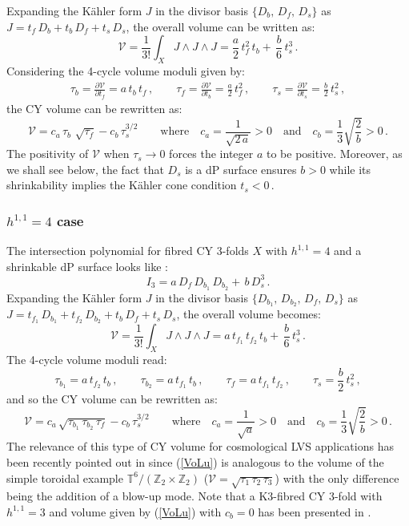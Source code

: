 \documentclass[11pt,a4paper]{article}
\newcommand{\bea}{\begin{eqnarray}}
\newcommand{\eea}{\end{eqnarray}}
\newcommand{\be}{\begin{equation}}
\newcommand{\ee}{\end{equation}}
\def\T{{\mathbb T}}
\def\Z{{\mathbb Z}}
\newcommand\vo{{\mathcal{V}}}
\begin{document}
Expanding the K\"ahler form $J$ in the divisor basis $\{D_b, \, D_f, \, D_s\}$ as $J = t_f\, D_b+t_b \, D_f+ t_s\, D_s$, the overall volume can be written as:
\be
\vo = \frac{1}{3!}\int_X J \wedge J \wedge J = \frac{a}{2}\, t_f^2\, t_b +\,  \frac{b}{6}\, t_s^3 \,.
\ee
Considering the 4-cycle volume moduli given by:
\bea
\tau_b = \frac{\partial \vo}{\partial t_f} = a\, t_b \, t_f\,, \qquad \tau_f = \frac{\partial \vo}{\partial t_b}=\frac{a}{2}\, t_f^2\,, \qquad \tau_s = \frac{\partial \vo}{\partial t_s}=\frac{b}{2}\,t_s^2\,,
\eea
the CY volume can be rewritten as:
\be
\vo = c_a\,\tau_b\, \, \sqrt{\tau_f} - c_b\,\tau_s^{3/2}\qquad\text{where}\quad c_a= \frac{1}{\sqrt{2\,a}}>0\quad\text{and}\quad c_b = \frac13 
\sqrt{\frac{2}{b}}>0\,.
\ee
The positivity of $\vo$ when $\tau_s\to 0$ forces the integer $a$ to be positive. Moreover, as we shall see below, the fact that $D_s$ is a dP surface 
ensures $b>0$ while its shrinkability implies the K\"ahler cone condition $t_s <0\,$.

\subsubsection*{$h^{1,1}=4$ case}

The intersection polynomial for fibred CY 3-folds $X$ with $h^{1,1} = 4$ and a shrinkable dP surface looks like \cite{Cicoli:2011it}:
\be
I_3 = a\, D_f\, D_{b_1} \, D_{b_2}+\, b\, D_s^3\,.
\ee
Expanding the K\"ahler form $J$ in the divisor basis $\{D_{b_1}, \,D_{b_2},\, D_f, \, D_s\}$ as $J = t_{f_1}\, D_{b_1}+ t_{f_2}\, D_{b_2}+t_b \, D_f+ t_s\, D_s$, the overall volume becomes:
\be
\vo = \frac{1}{3!}\int_X J \wedge J \wedge J = a\, t_{f_1}\, t_{f_2}\, t_b +\,  \frac{b}{6}\, t_s^3 \,.
\ee
The 4-cycle volume moduli read:
\be
\tau_{b_1} = a\, t_{f_2} \, t_b\,, \qquad \tau_{b_2} = a\, t_{f_1} \, t_b\,, \qquad \tau_f = a\, t_{f_1} \, t_{f_2}\,, \qquad \tau_s = \frac{b}{2}\, t_s^2\,,
\ee
and so the CY volume can be rewritten as:
\be
\vo = c_a\,\sqrt{\tau_{b_1}\, \tau_{b_2}\, \tau_f} - c_b\, \tau_s^{3/2}\qquad\text{where}\quad c_a= \frac{1}{\sqrt{a}}>0\quad\text{and}\quad c_b = \frac13\sqrt{\frac{2}{b}}>0\,.
\label{VoLu}
\ee
The relevance of this type of CY volume for cosmological LVS applications has been recently pointed out in \cite{Burgess:2016owb} since (\ref{VoLu}) is analogous to the volume of the simple toroidal example $\T^6/(\Z_2 \times \Z_2)$ ($\vo = \sqrt{\tau_1\, \tau_2\, \tau_3}$) with the only difference being the addition of a blow-up mode. Note that a K3-fibred CY 3-fold with $h^{1,1}=3$ and volume given by (\ref{VoLu}) with $c_b=0$ has been presented in \cite{Gao:2013pra}.
\end{document}
